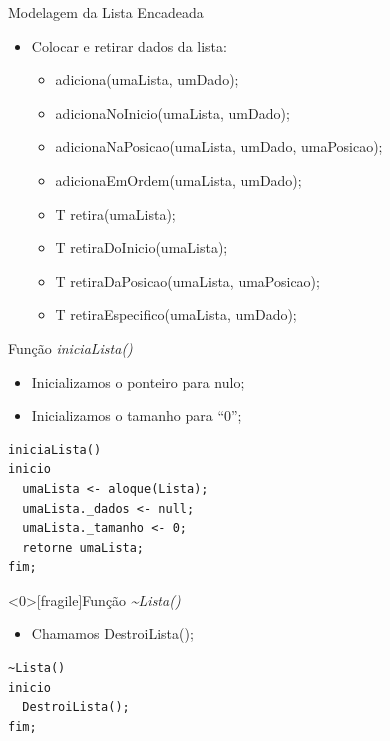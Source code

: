 \documentclass[12pt,table,xcolor={dvipsnames}]{beamer}
\begin{document}
\begin{frame}[fragile]{Modelagem da Lista Encadeada}

\begin{itemize}
\item Colocar e retirar dados da lista:
\begin{itemize}
\item adiciona(umaLista, umDado);
\item adicionaNoInicio(umaLista, umDado);
\item adicionaNaPosicao(umaLista, umDado, umaPosicao);
\item adicionaEmOrdem(umaLista, umDado);
\item T retira(umaLista);
\item T retiraDoInicio(umaLista);
\item T retiraDaPosicao(umaLista, umaPosicao);
\item T retiraEspecifico(umaLista, umDado);
\end{itemize}
\end{itemize}
\end{frame}

\begin{frame}[fragile]{Função \textit{iniciaLista()}}

\begin{itemize}
\item Inicializamos o ponteiro para nulo;
\item Inicializamos o tamanho para ``0'';
\end{itemize}
\begin{lstlisting}
iniciaLista()
inicio
  umaLista <- aloque(Lista);
  umaLista._dados <- null;
  umaLista._tamanho <- 0;
  retorne umaLista;
fim;
\end{lstlisting}
\end{frame}

\begin{frame}<0>[fragile]{Função \textit{\~{}Lista()}}

\begin{itemize}
\item Chamamos DestroiLista();
\end{itemize}
\begin{lstlisting}
~Lista()
inicio
  DestroiLista();
fim;
\end{lstlisting}
\end{frame}
\end{document}
